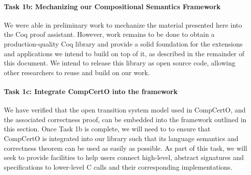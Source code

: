\vspace*{-2ex}
\paragraph*{Task 1b: Mechanizing our Compositional Semantics Framework}

We were able in preliminary work to mechanize the material presented here
into the Coq proof assistant.
However,
work remains to be done to obtain a production-quality Coq library
and provide a solid foundation for the extensions and applications
we intend to build on top of it,
as described in the remainder of this document.
We intend to release this library as open source code,
allowing other researchers to reuse and build on our work.

\vspace*{-2ex}
\paragraph*{Task 1c: Integrate CompCertO into the framework}

We have verified that the open transition system model used in CompCertO,
and the associated correctness proof,
can be embedded into the framework outlined in this section.
Once Task 1b is complete,
we will need to to ensure that CompCertO is integrated into our library
such that its language semantics and correctness theorem can be used
as easily as possible.
As part of this task,
we will seek to provide facilities
to help users connect high-level, abstract signatures and specifications
to lower-level C calls and their corresponding implementations.

